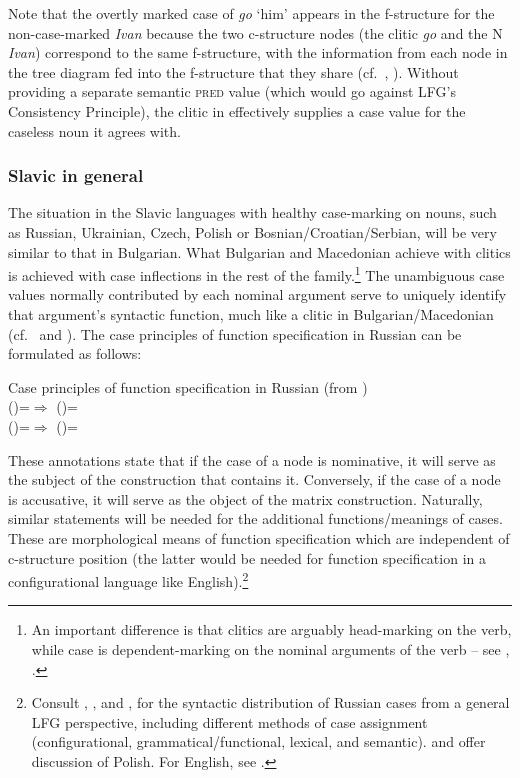 \documentclass[output=paper,hidelinks]{langscibook}
\begin{document}
Note that the overtly marked case of \textit{go} `him' appears in the f-structure for the non-case-marked \textit{Ivan} because the two c-structure nodes (the clitic \textit{go} and the N \textit{Ivan}) correspond to the same f-structure, with the information from each node in the tree diagram fed into the f-structure that they share (cf.\ \citealt[74--75]{dalrymple01}, \citealt[48]{BresnanEtAl2016}). Without providing a separate semantic \textsc{pred} value (which would go against LFG's Consistency Principle), the clitic in  effectively supplies a case value for the caseless noun it agrees with.

\subsubsection{Slavic in general}
\label{sec:Slavic:2.4.3}

The situation in the Slavic languages with healthy case-marking on nouns, such as Russian, Ukrainian, Czech, Polish or Bosnian/Croatian/Serbian, will be very similar to that in Bulgarian. What Bulgarian and Macedonian achieve with clitics is achieved with case inflections in the rest of the family.\footnote{An important difference is that clitics are arguably head-marking on the verb, while case is dependent-marking on the nominal arguments of the verb -- see \citet{JaegerGerassimova2002}, \citet[113--115, 205--207]{BresnanEtAl2016}.} The unambiguous case values normally contributed by each nominal argument serve to uniquely identify that argument's syntactic function, much like a clitic in Bulgarian/Macedonian (cf.\  and ). The case principles of function specification in Russian can be formulated as follows: 

\ea\label{ex:Slavic:21} Case principles of function specification in Russian (from \citealt[70--71, 203--205]{BresnanEtAl2016})\\%
 (\DOWN\CASE)=\NOM $\Rightarrow$ (\UP\SUBJ)=\DOWN\\
 (\DOWN\CASE)=\ACC $\Rightarrow$ (\UP\OBJ)=\DOWN\\
\z

These annotations state that if the case of a node is nominative, it will serve as the subject of the construction that contains it. Conversely, if the case of a node is accusative, it will serve as the object of the matrix construction. Naturally, similar statements will be needed for the additional functions/meanings of cases. These are morphological means of function specification which are independent of c-structure position (the latter would be needed for function specification in a configurational language like English).\footnote{Consult \citet{Neidle1988}, \citet[esp. Chapter~8]{King95}, and \citet{Bloom1999}, for the syntactic distribution of Russian cases from a general LFG perspective, including different methods of case assignment (configurational, grammatical/functional, lexical, and semantic). \citet{PrzepiorkowskiPatejuk2011,przepiorkowski-patejuk2012,prz:pat:12b} and \citet{Patejuk2015} offer discussion of Polish.  For English, see \citet{Hristov2012,Hristov:Case}.}
\end{document}
